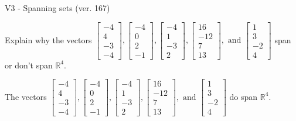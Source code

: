 \begin{exercise}
  \begin{exerciseTitle}V3 - Spanning sets (ver. 167)\end{exerciseTitle}
  \begin{exerciseStatement}
    Explain why the vectors \(\left[\begin{array}{r}
-4 \\
4 \\
-3 \\
-4
\end{array}\right] , \left[\begin{array}{r}
-4 \\
0 \\
2 \\
-1
\end{array}\right] , \left[\begin{array}{r}
-4 \\
1 \\
-3 \\
2
\end{array}\right] , \left[\begin{array}{r}
16 \\
-12 \\
7 \\
13
\end{array}\right] , \text{ and } \left[\begin{array}{r}
1 \\
3 \\
-2 \\
4
\end{array}\right]\) span or don't span \(\mathbb{R}^4\). 
	


  \end{exerciseStatement}
  \begin{exerciseAnswer}
   The vectors \(\left[\begin{array}{r}
-4 \\
4 \\
-3 \\
-4
\end{array}\right] , \left[\begin{array}{r}
-4 \\
0 \\
2 \\
-1
\end{array}\right] , \left[\begin{array}{r}
-4 \\
1 \\
-3 \\
2
\end{array}\right] , \left[\begin{array}{r}
16 \\
-12 \\
7 \\
13
\end{array}\right] , \text{ and } \left[\begin{array}{r}
1 \\
3 \\
-2 \\
4
\end{array}\right]\) 
  	 do  
	span \(\mathbb{R}^4\).
  



\end{exerciseAnswer}
\end{exercise}

